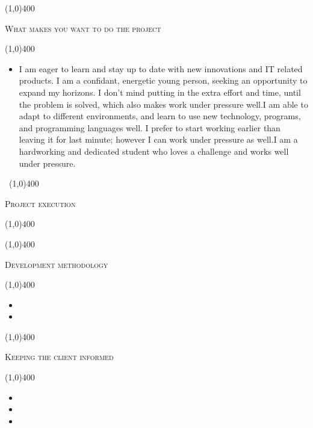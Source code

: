 \documentclass[12pt,a4paper]{report}
\begin{document}
\begin{center}
	
	\line(1,0){400}\\
	{\scshape\large What makes you want to do the project\par}
	\line(1,0){400}\\
	\end{center}
		\begin{itemize}
\item  I am eager to learn and stay up to date with new innovations and IT related products. I am a
confidant, energetic young person, seeking an opportunity to expand my horizons. I don’t
mind putting in the extra effort and time, until the problem is solved, which also makes work
under pressure well.I am able to adapt to different environments, and learn to use new technology, programs,
and programming languages well. I prefer to start working earlier than leaving it for last
minute; however I can work under pressure as well.I am a hardworking and dedicated student who loves a challenge and works well under
pressure.
\end{itemize}
\newpage
	\begin{center}
	\vspace*{-3cm}\
	\line(1,0){400}\\
	{\scshape\Large Project execution\par}
	\line(1,0){400}\\
	\end{center}
	
	\begin{center}
	
	\line(1,0){400}\\
	{\scshape\large Development methodology \par}
	\line(1,0){400}\\
	\end{center}
		\begin{itemize}
\item 
\item 
\end{itemize}

\begin{center}
	
	\line(1,0){400}\\
	{\scshape\large Keeping the client informed \par}
	\line(1,0){400}\\
	\end{center}
		\begin{itemize}
\item 
\item 
\item
\end{itemize}
\end{document}
